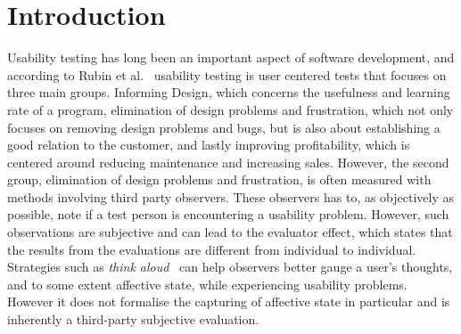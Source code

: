 
\section{Introduction}

Usability testing has long been an important aspect of software development, and according to Rubin et al.~\cite{rubin2008handbook} usability testing is user centered tests that focuses on three main groups.
Informing Design, which concerns the usefulness and learning rate of a program,
elimination of design problems and frustration, which not only focuses on removing design problems and bugs, but is also about establishing a good relation to the customer, and lastly improving profitability, which is centered around reducing maintenance and increasing sales.
However, the second group, elimination of design problems and frustration, is often measured with methods involving third party observers.
These observers has to, as objectively as possible, note if a test person is encountering a usability problem.
However, such observations are subjective and can lead to the evaluator effect\cite{eval_effect}, which states that the results from the evaluations are different from individual to individual.
Strategies such as \textit{think aloud}~\cite{use_of_TA_and_IDA} can help observers better gauge a user's
thoughts, and to some extent affective state, while experiencing usability problems. However it does
not formalise the capturing of affective state in particular and is inherently a third-party
subjective evaluation. 

